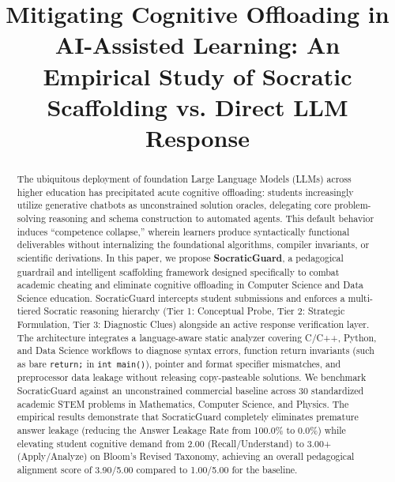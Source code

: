 \documentclass[conference]{IEEEtran}
\begin{document}
\title{Mitigating Cognitive Offloading in AI-Assisted Learning: An Empirical Study of Socratic Scaffolding vs. Direct LLM Response}

\author{
}

\maketitle

\begin{abstract}
The ubiquitous deployment of foundation Large Language Models (LLMs) across higher education has precipitated acute cognitive offloading: students increasingly utilize generative chatbots as unconstrained solution oracles, delegating core problem-solving reasoning and schema construction to automated agents. This default behavior induces ``competence collapse,'' wherein learners produce syntactically functional deliverables without internalizing the foundational algorithms, compiler invariants, or scientific derivations. In this paper, we propose \textbf{SocraticGuard}, a pedagogical guardrail and intelligent scaffolding framework designed specifically to combat academic cheating and eliminate cognitive offloading in Computer Science and Data Science education. SocraticGuard intercepts student submissions and enforces a multi-tiered Socratic reasoning hierarchy (Tier 1: Conceptual Probe, Tier 2: Strategic Formulation, Tier 3: Diagnostic Clues) alongside an active response verification layer. The architecture integrates a language-aware static analyzer covering C/C++, Python, and Data Science workflows to diagnose syntax errors, function return invariants (such as bare \texttt{return;} in \texttt{int main()}), pointer and format specifier mismatches, and preprocessor data leakage without releasing copy-pasteable solutions. We benchmark SocraticGuard against an unconstrained commercial baseline across 30 standardized academic STEM problems in Mathematics, Computer Science, and Physics. The empirical results demonstrate that SocraticGuard completely eliminates premature answer leakage (reducing the Answer Leakage Rate from 100.0\% to 0.0\%) while elevating student cognitive demand from 2.00 (Recall/Understand) to 3.00+ (Apply/Analyze) on Bloom's Revised Taxonomy, achieving an overall pedagogical alignment score of 3.90/5.00 compared to 1.00/5.00 for the baseline.
\end{abstract}
\end{document}

